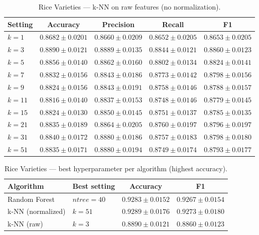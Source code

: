 \documentclass{article}
\begin{document}
\begin{table}[H]
\centering
\small
\caption{Rice Varieties --- k-NN on raw features (no normalization).}
\label{tab:rice-knn-raw}
\begin{tabular}{@{}lcccc@{}}
\toprule
Setting & Accuracy & Precision & Recall & F1 \\
\midrule
$k=1$  & $0.8682 \pm 0.0201$ & $0.8660 \pm 0.0209$ & $0.8652 \pm 0.0205$ & $0.8653 \pm 0.0205$ \\
$k=3$  & $\mathbf{0.8890 \pm 0.0121}$ & $\mathbf{0.8889 \pm 0.0135}$ & $\mathbf{0.8844 \pm 0.0121}$ & $\mathbf{0.8860 \pm 0.0123}$ \\
$k=5$  & $0.8856 \pm 0.0140$ & $0.8862 \pm 0.0160$ & $0.8802 \pm 0.0134$ & $0.8824 \pm 0.0141$ \\
$k=7$  & $0.8832 \pm 0.0156$ & $0.8843 \pm 0.0186$ & $0.8773 \pm 0.0142$ & $0.8798 \pm 0.0156$ \\
$k=9$  & $0.8824 \pm 0.0156$ & $0.8843 \pm 0.0191$ & $0.8758 \pm 0.0146$ & $0.8788 \pm 0.0157$ \\
$k=11$ & $0.8816 \pm 0.0140$ & $0.8837 \pm 0.0153$ & $0.8748 \pm 0.0146$ & $0.8779 \pm 0.0145$ \\
$k=15$ & $0.8824 \pm 0.0130$ & $0.8850 \pm 0.0145$ & $0.8751 \pm 0.0137$ & $0.8785 \pm 0.0135$ \\
$k=21$ & $0.8835 \pm 0.0189$ & $0.8864 \pm 0.0205$ & $0.8760 \pm 0.0197$ & $0.8796 \pm 0.0197$ \\
$k=31$ & $0.8840 \pm 0.0172$ & $0.8880 \pm 0.0186$ & $0.8757 \pm 0.0183$ & $0.8798 \pm 0.0180$ \\
$k=51$ & $0.8835 \pm 0.0171$ & $0.8880 \pm 0.0194$ & $0.8749 \pm 0.0174$ & $0.8793 \pm 0.0177$ \\
\bottomrule
\end{tabular}
\end{table}

\begin{table}[H]
\centering
\small
\caption{Rice Varieties --- best hyperparameter per algorithm (highest accuracy).}
\label{tab:rice-headline}
\begin{tabular}{@{}llcc@{}}
\toprule
Algorithm & Best setting & Accuracy & F1 \\
\midrule
Random Forest          & $\mathit{ntree}=40$       & $0.9283 \pm 0.0152$ & $0.9267 \pm 0.0154$ \\
k-NN (normalized)      & $k=51$                    & $\mathbf{0.9289 \pm 0.0176}$ & $\mathbf{0.9273 \pm 0.0180}$ \\
k-NN (raw)             & $k=3$                     & $0.8890 \pm 0.0121$ & $0.8860 \pm 0.0123$ \\
\bottomrule
\end{tabular}
\end{table}
\end{document}
